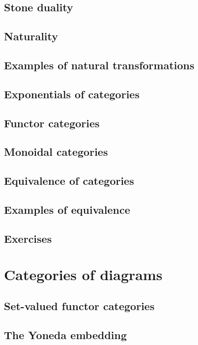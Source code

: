 \documentclass[uplatex, 12pt, dvipdfmx]{jsarticle}
\begin{document}
\subsection{Stone duality}

\subsection{Naturality}

\subsection{Examples of natural transformations}

\subsection{Exponentials of categories}

\subsection{Functor categories}

\subsection{Monoidal categories}

\subsection{Equivalence of categories}

\subsection{Examples of equivalence}

\subsection{Exercises}

\section{Categories of diagrams}

\subsection{Set-valued functor categories}

\subsection{The Yoneda embedding}
\end{document}
